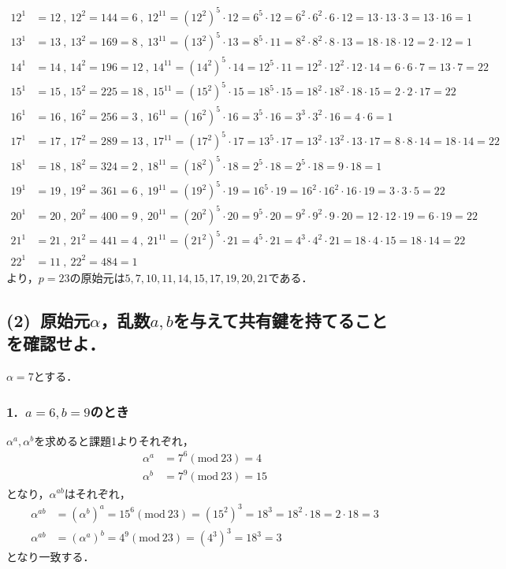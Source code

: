\documentclass[a4paper,12pt]{jarticle}
\begin{document}
  \begin{align*}
 12^1&=12~,~12^2=144=6~,~12^{11}=(12^2)^5\cdot12=6^5\cdot12=6^2\cdot6^2\cdot6\cdot12=13\cdot13\cdot3=13\cdot16=1\nonumber\\
 13^1&=13~,~13^2=169=8~,~13^{11}=(13^2)^5\cdot13=8^5\cdot11=8^2\cdot8^2\cdot8\cdot13=18\cdot18\cdot12=2\cdot12=1\nonumber\\
 14^1&=14~,~14^2=196=12~,~14^{11}=(14^2)^5\cdot14=12^5\cdot11=12^2\cdot12^2\cdot12\cdot14=6\cdot6\cdot7=13\cdot7=22\nonumber\\
 15^1&=15~,~15^2=225=18~,~15^{11}=(15^2)^5\cdot15=18^5\cdot15=18^2\cdot18^2\cdot18\cdot15=2\cdot2\cdot17=22\nonumber\\
 16^1&=16~,~16^2=256=3~,~16^{11}=(16^2)^5\cdot16=3^5\cdot16=3^3\cdot3^2\cdot16=4\cdot6=1\nonumber\\
 17^1&=17~,~17^2=289=13~,~17^{11}=(17^2)^5\cdot17=13^5\cdot17=13^2\cdot13^2\cdot13\cdot17=8\cdot8\cdot14=18\cdot14=22\nonumber\\
 18^1&=18~,~18^2=324=2~,~18^{11}=(18^2)^5\cdot18=2^5\cdot18=2^5\cdot18=9\cdot18=1\nonumber\\
 19^1&=19~,~19^2=361=6~,~19^{11}=(19^2)^5\cdot19=16^5\cdot19=16^2\cdot16^2\cdot16\cdot19=3\cdot3\cdot5=22\nonumber\\
 20^1&=20~,~20^2=400=9~,~20^{11}=(20^2)^5\cdot20=9^5\cdot20=9^2\cdot9^2\cdot9\cdot20=12\cdot12\cdot19=6\cdot19=22\nonumber\\
 21^1&=21~,~21^2=441=4~,~21^{11}=(21^2)^5\cdot21=4^5\cdot21=4^3\cdot4^2\cdot21=18\cdot4\cdot15=18\cdot14=22\nonumber\\
 22^1&=11~,~22^2=484=1\nonumber
  \end{align*}
%
より，$p=23$の原始元は$5,7,10,11,14,15,17,19,20,21$である．
\vspace{-6mm}
\subsection*{(2)~原始元$\alpha$，乱数$a,b$を与えて共有鍵を持てることを確認せよ．}
\vspace{-3mm}
$\alpha=7$とする．
\vspace{-6mm}
\subsubsection*{1.~$a=6,b=9$のとき}
\vspace{-4mm}
$\alpha^a,\alpha^b$を求めると課題1よりそれぞれ，
%
\begin{align}
 \alpha^a&=7^6(\mathrm{mod}~23)=4 \\
 \alpha^b&=7^9(\mathrm{mod}~23)=15
\end{align}
%
となり，$\alpha^{ab}$はそれぞれ，
%
\begin{align}
 \alpha^{ab}&=(\alpha^b)^a=15^6(\mathrm{mod}~23)=(15^2)^3=18^3=18^2\cdot18=2\cdot18=3\\
 \alpha^{ab}&=(\alpha^a)^b=4^9(\mathrm{mod}~23)=(4^3)^3=18^3=3
\end{align}
%
となり一致する．
\vspace{-6mm}
\end{document}
